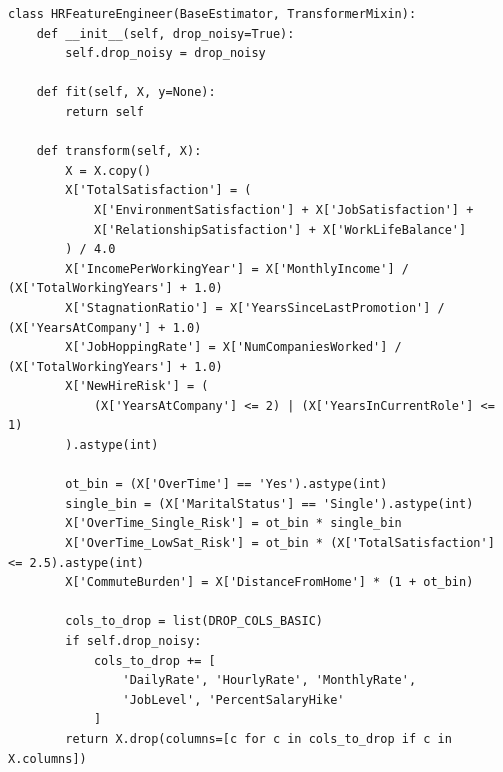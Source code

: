 \begin{lstlisting}[caption={Định nghĩa lớp HRFeatureEngineer và hàm khởi tạo Luồng B trong src/pipeline.py}]
class HRFeatureEngineer(BaseEstimator, TransformerMixin):
    def __init__(self, drop_noisy=True):
        self.drop_noisy = drop_noisy

    def fit(self, X, y=None):
        return self

    def transform(self, X):
        X = X.copy()
        X['TotalSatisfaction'] = (
            X['EnvironmentSatisfaction'] + X['JobSatisfaction'] +
            X['RelationshipSatisfaction'] + X['WorkLifeBalance']
        ) / 4.0
        X['IncomePerWorkingYear'] = X['MonthlyIncome'] / (X['TotalWorkingYears'] + 1.0)
        X['StagnationRatio'] = X['YearsSinceLastPromotion'] / (X['YearsAtCompany'] + 1.0)
        X['JobHoppingRate'] = X['NumCompaniesWorked'] / (X['TotalWorkingYears'] + 1.0)
        X['NewHireRisk'] = (
            (X['YearsAtCompany'] <= 2) | (X['YearsInCurrentRole'] <= 1)
        ).astype(int)

        ot_bin = (X['OverTime'] == 'Yes').astype(int)
        single_bin = (X['MaritalStatus'] == 'Single').astype(int)
        X['OverTime_Single_Risk'] = ot_bin * single_bin
        X['OverTime_LowSat_Risk'] = ot_bin * (X['TotalSatisfaction'] <= 2.5).astype(int)
        X['CommuteBurden'] = X['DistanceFromHome'] * (1 + ot_bin)

        cols_to_drop = list(DROP_COLS_BASIC)
        if self.drop_noisy:
            cols_to_drop += [
                'DailyRate', 'HourlyRate', 'MonthlyRate',
                'JobLevel', 'PercentSalaryHike'
            ]
        return X.drop(columns=[c for c in cols_to_drop if c in X.columns])
\end{lstlisting}
